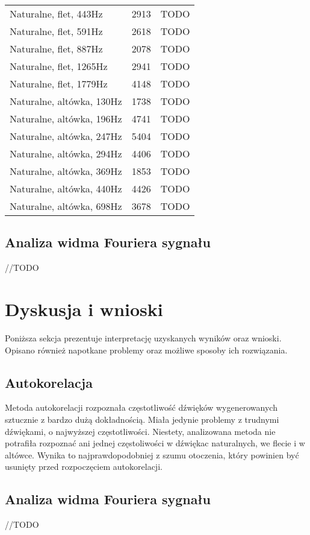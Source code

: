 \documentclass{classrep}
\begin{document}
\begin{tabular}{ l | c | c }
  Naturalne, flet, 443Hz & 2913 & TODO \\
  Naturalne, flet, 591Hz & 2618 & TODO \\
  Naturalne, flet, 887Hz & 2078 & TODO \\
  Naturalne, flet, 1265Hz & 2941 & TODO \\
  Naturalne, flet, 1779Hz & 4148 & TODO \\
  \hline 
  Naturalne, altówka, 130Hz & 1738 & TODO \\
  Naturalne, altówka, 196Hz & 4741 & TODO \\
  Naturalne, altówka, 247Hz & 5404 & TODO \\
  Naturalne, altówka, 294Hz & 4406 & TODO \\
  Naturalne, altówka, 369Hz & 1853 & TODO \\
  Naturalne, altówka, 440Hz & 4426 & TODO \\
  Naturalne, altówka, 698Hz & 3678 & TODO \\
  \hline 
\end{tabular}

\subsection{Analiza widma Fouriera sygnału}
//TODO

\section{Dyskusja i wnioski}
Poniższa sekcja prezentuje interpretację uzyskanych wyników oraz wnioski. Opisano również napotkane problemy oraz możliwe sposoby ich rozwiązania.

\subsection{Autokorelacja}
Metoda autokorelacji rozpoznała częstotliwość dźwięków wygenerowanych sztucznie z bardzo dużą dokładnością. Miała jedynie problemy z trudnymi dźwiękami, o najwyższej częstotliwości. Niestety, analizowana metoda nie potrafiła rozpoznać ani jednej częstoliwości w dźwiękac naturalnych, we flecie i w altówce. Wynika to najprawdopodobniej z szumu otoczenia, który powinien być usunięty przed rozpoczęciem autokorelacji.

\subsection{Analiza widma Fouriera sygnału}
//TODO

\begin{thebibliography}{1}
\\
\\
\\
\end{thebibliography}
\end{document}
